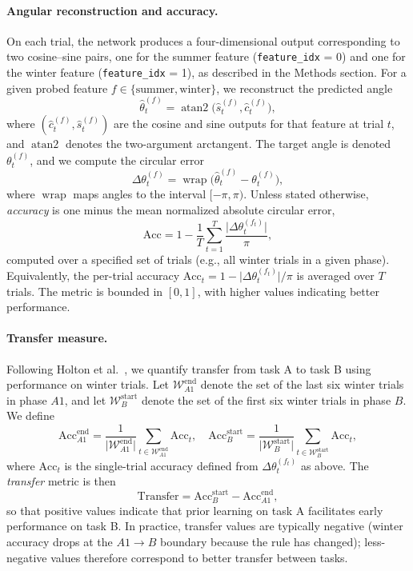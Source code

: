 \documentclass{article}
\theoremstyle{plain}
\theoremstyle{definition}
\theoremstyle{remark}
\begin{document}
\paragraph{Angular reconstruction and accuracy.}
On each trial, the network produces a four-dimensional output corresponding to two cosine--sine pairs, one for the summer feature (\texttt{feature\_idx} = 0) and one for the winter feature (\texttt{feature\_idx} = 1), as described in the Methods section. For a given probed feature $f \in \{\text{summer}, \text{winter}\}$, we reconstruct the predicted angle
\[
\hat{\theta}_t^{(f)} = \operatorname{atan2}\!\big(\hat{s}_t^{(f)}, \hat{c}_t^{(f)}\big),
\]
where $(\hat{c}_t^{(f)}, \hat{s}_t^{(f)})$ are the cosine and sine outputs for that feature at trial $t$, and $\operatorname{atan2}$ denotes the two-argument arctangent. The target angle is denoted $\theta_t^{(f)}$, and we compute the circular error
\[
\Delta \theta_t^{(f)} = \operatorname{wrap}\big(\hat{\theta}_t^{(f)} - \theta_t^{(f)}\big),
\]
where $\operatorname{wrap}$ maps angles to the interval $[-\pi, \pi)$. Unless stated otherwise, \emph{accuracy} is one minus the mean normalized absolute circular error,
\[
\mathrm{Acc} = 1 - \frac{1}{T} \sum_{t=1}^T \frac{\lvert \Delta \theta_t^{(f_t)} \rvert}{\pi},
\]
computed over a specified set of trials (e.g., all winter trials in a given phase). Equivalently, the per-trial accuracy $\mathrm{Acc}_t = 1 - \lvert \Delta \theta_t^{(f_t)} \rvert / \pi$ is averaged over $T$ trials. The metric is bounded in $[0, 1]$, with higher values indicating better performance.

\paragraph{Transfer measure.}
Following Holton et al.~\cite{holton2025humans}, we quantify transfer from task A to task B using performance on winter trials. Let $\mathcal{W}_{A1}^{\text{end}}$ denote the set of the last six winter trials in phase $A1$, and let $\mathcal{W}_{B}^{\text{start}}$ denote the set of the first six winter trials in phase $B$. We define
\[
\mathrm{Acc}_{A1}^{\text{end}} = \frac{1}{\lvert \mathcal{W}_{A1}^{\text{end}} \rvert} \sum_{t \in \mathcal{W}_{A1}^{\text{end}}} \mathrm{Acc}_t,
\quad
\mathrm{Acc}_{B}^{\text{start}} = \frac{1}{\lvert \mathcal{W}_{B}^{\text{start}} \rvert} \sum_{t \in \mathcal{W}_{B}^{\text{start}}} \mathrm{Acc}_t,
\]
where $\mathrm{Acc}_t$ is the single-trial accuracy defined from $\Delta \theta_t^{(f_t)}$ as above. The \emph{transfer} metric is then
\[
\mathrm{Transfer} = \mathrm{Acc}_{B}^{\text{start}} - \mathrm{Acc}_{A1}^{\text{end}},
\]
so that positive values indicate that prior learning on task A facilitates early performance on task B. In practice, transfer values are typically negative (winter accuracy drops at the $A1 \rightarrow B$ boundary because the rule has changed); less-negative values therefore correspond to better transfer between tasks.
\end{document}

